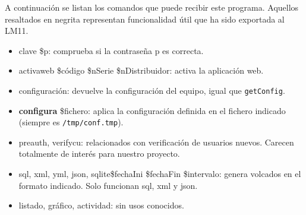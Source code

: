 A continuación se listan los comandos que puede recibir este programa. Aquellos resaltados en negrita representan funcionalidad útil que ha sido exportada al LM11.
\begin{itemize}
	\item clave \$p: comprueba si la contraseña p es correcta.
	\item activaweb \$código \$nSerie \$nDistribuidor: activa la aplicación web.
	\item configuración: devuelve la configuración del equipo, igual que \verb|getConfig|.
	\item \textbf{configura} \$fichero: aplica la configuración definida en el fichero indicado (siempre es \verb|/tmp/conf.tmp|).
	\item \textbraceleft preauth, verifycu\textbraceright: relacionados con verificación de usuarios nuevos. Carecen totalmente de interés para nuestro proyecto.
	\item \textbraceleft sql, xml, yml, json, sqlite\textbraceright  \$fechaIni \$fechaFin \$intervalo: genera volcados en el formato indicado. Solo funcionan sql, xml y json.
	\item \textbraceleft listado, gráfico, actividad\textbraceright: sin usos conocidos.
\end{itemize}